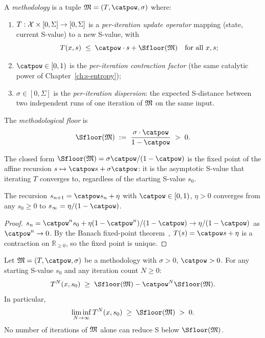 \begin{definition}[Methodology]\label{def:methodology}
A \emph{methodology} is a tuple $\Meth = (T, \catpow, \sigma)$ where:
\begin{enumerate}[nosep, label=(\roman*)]
  \item $T : \mathcal{X} \times [0, \Sigma] \to [0, \Sigma]$ is a \emph{per-iteration update operator} mapping (state, current S-value) to a new S-value, with
        \[
        T(x, s) \;\leq\; \catpow \cdot s + \Sfloor(\Meth) \quad \text{for all } x, s;
        \]
  \item $\catpow \in [0, 1)$ is the \emph{per-iteration contraction factor} (the same catalytic power of Chapter~\ref{ch:s-entropy});
  \item $\sigma \in [0, \Sigma]$ is the \emph{per-iteration dispersion}: the expected S-distance between two independent runs of one iteration of $\mathfrak{M}$ on the same input.
\end{enumerate}
The \emph{methodological floor} is
\[
\Sfloor(\Meth) \;:=\; \frac{\sigma \cdot \catpow}{1 - \catpow} \;>\; 0.
\]
\end{definition}

The closed form $\Sfloor(\Meth) = \sigma\catpow/(1-\catpow)$ is the fixed point of the affine recursion $s \mapsto \catpow s + \sigma\catpow$: it is the asymptotic S-value that iterating $T$ converges to, regardless of the starting S-value $s_0$.

\begin{lemma}\label{lem:affine-fixed}
The recursion $s_{n+1} = \catpow s_n + \eta$ with $\catpow \in [0,1)$, $\eta > 0$ converges from any $s_0 \geq 0$ to $s_\infty = \eta/(1-\catpow)$.
\end{lemma}

\begin{proof}
$s_n = \catpow^n s_0 + \eta(1 - \catpow^n)/(1-\catpow) \to \eta/(1-\catpow)$ as $\catpow^n \to 0$. By the Banach fixed-point theorem~\citep{banach1922}, $T(s) = \catpow s + \eta$ is a contraction on $\mathbb{R}_{\geq 0}$, so the fixed point is unique.
\end{proof}

\begin{theorem}\label{thm:method-floor}
Let $\Meth = (T, \catpow, \sigma)$ be a methodology with $\sigma > 0$, $\catpow > 0$. For any starting S-value $s_0$ and any iteration count $N \geq 0$:
\[
T^N(x, s_0) \;\geq\; \Sfloor(\Meth) - \catpow^N \Sfloor(\Meth).
\]
In particular,
\[
\liminf_{N \to \infty} T^N(x, s_0) \;\geq\; \Sfloor(\Meth) \;>\; 0.
\]
No number of iterations of $\mathfrak{M}$ alone can reduce S below $\Sfloor(\Meth)$.
\end{theorem}

